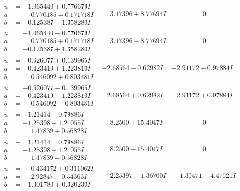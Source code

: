 \documentclass[1p]{elsarticle_modified}
\theoremstyle{definition}
\begin{document}
$$\begin{array}{c|c|c}
\begin{aligned}
u &= -1.065440 + 0.776679 I \\
a &= \phantom{-}0.770185 - 0.171718 I \\
b &= -0.125387 - 1.358280 I\end{aligned}
 & \phantom{-}3.17396 + 8.77694 I & \phantom{-0.000000 } 0 \\ \hline\begin{aligned}
u &= -1.065440 - 0.776679 I \\
a &= \phantom{-}0.770185 + 0.171718 I \\
b &= -0.125387 + 1.358280 I\end{aligned}
 & \phantom{-}3.17396 - 8.77694 I & \phantom{-0.000000 } 0 \\ \hline\begin{aligned}
u &= -0.626077 + 0.139965 I \\
a &= -0.423419 + 1.223810 I \\
b &= \phantom{-}0.546092 + 0.803481 I\end{aligned}
 & -2.68564 - 0.62982 I & -2.91172 - 0.97884 I \\ \hline\begin{aligned}
u &= -0.626077 - 0.139965 I \\
a &= -0.423419 - 1.223810 I \\
b &= \phantom{-}0.546092 - 0.803481 I\end{aligned}
 & -2.68564 + 0.62982 I & -2.91172 + 0.97884 I \\ \hline\begin{aligned}
u &= -1.21414 + 0.79886 I \\
a &= -1.25398 + 1.21055 I \\
b &= \phantom{-}1.47839 + 0.56828 I\end{aligned}
 & \phantom{-}8.2500 + 15.4047 I & \phantom{-0.000000 } 0 \\ \hline\begin{aligned}
u &= -1.21414 - 0.79886 I \\
a &= -1.25398 - 1.21055 I \\
b &= \phantom{-}1.47839 - 0.56828 I\end{aligned}
 & \phantom{-}8.2500 - 15.4047 I & \phantom{-0.000000 } 0 \\ \hline\begin{aligned}
u &= \phantom{-}0.434172 + 0.311062 I \\
a &= \phantom{-}2.92847 - 0.34363 I \\
b &= -1.301780 + 0.320230 I\end{aligned}
 & \phantom{-}2.25397 - 1.36700 I & \phantom{-}1.30471 + 4.47621 I \\ \hline\begin{aligned}

\end{aligned}
\end{array}$$
\end{document}
